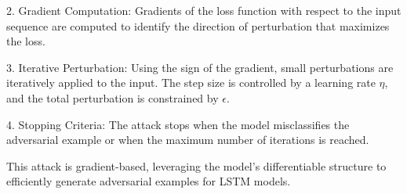 2. Gradient Computation: Gradients of the loss function with respect to the input sequence are computed to identify the direction of perturbation that maximizes the loss.

3. Iterative Perturbation: Using the sign of the gradient, small perturbations are iteratively applied to the input. The step size is controlled by a learning rate $\eta$, and the total perturbation is constrained by $\epsilon$.

4. Stopping Criteria: The attack stops when the model misclassifies the adversarial example or when the maximum number of iterations is reached.

This attack is gradient-based, leveraging the model's differentiable structure to efficiently generate adversarial examples for LSTM models.
